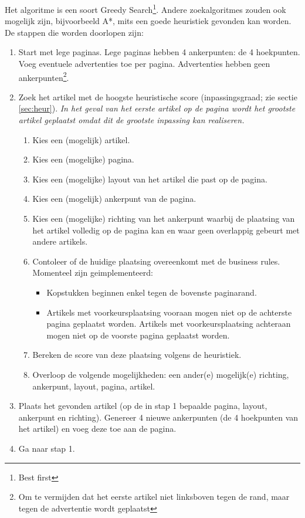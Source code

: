 \documentclass[a4paper,12pt]{article}
\begin{document}
Het algoritme is een soort Greedy Search\footnote{Best first}. Andere zoekalgoritmes zouden ook mogelijk zijn, bijvoorbeeld A*, mits een goede heuristiek gevonden kan worden. De stappen die worden doorlopen zijn:
\begin{enumerate}
	\item[] Start met lege paginas. Lege paginas hebben 4 ankerpunten: de 4 hoekpunten. Voeg eventuele advertenties toe per pagina. Advertenties hebben geen ankerpunten\footnote{Om te vermijden dat het eerste artikel niet linksboven tegen de rand, maar tegen de advertentie wordt geplaatst}.
	\item Zoek het artikel met de hoogste heuristische score (inpassingsgraad; zie sectie \ref{sec:heur}). \textit{In het geval van het eerste artikel op de pagina wordt het grootste artikel geplaatst omdat dit de grootste inpassing kan realiseren.}
	
	\begin{enumerate}
		\item Kies een (mogelijk) artikel.
		\item Kies een (mogelijke) pagina.
		\item Kies een (mogelijke) layout van het artikel die past op de pagina.
		\item Kies een (mogelijk) ankerpunt van de pagina.
		\item Kies een (mogelijke) richting van het ankerpunt waarbij de plaatsing van het artikel volledig op de pagina kan en waar geen overlappig gebeurt met andere artikels.
\newpage
		\item Contoleer of de huidige plaatsing overeenkomt met de business rules. Momenteel zijn geimplementeerd:
			\begin{itemize}
				\item Kopstukken beginnen enkel tegen de bovenste paginarand.
				\item Artikels met voorkeursplaatsing vooraan mogen niet op de achterste pagina geplaatst worden. Artikels met voorkeursplaatsing achteraan mogen niet op de voorste pagina geplaatst worden.
			\end{itemize}
		\item Bereken de score van deze plaatsing volgens de heuristiek.
		\item Overloop de volgende mogelijkheden: een ander(e) mogelijk(e) richting, ankerpunt, layout, pagina, artikel.
	\end{enumerate}
	
	\item Plaats het gevonden artikel (op de in stap 1 bepaalde pagina, layout, ankerpunt en richting). Genereer 4 nieuwe ankerpunten (de 4 hoekpunten van het artikel) en voeg deze toe aan de pagina.
	
	\item Ga naar stap 1.
\end{enumerate}
\end{document}
